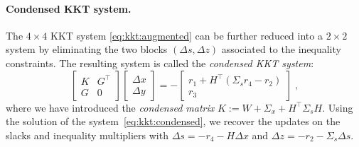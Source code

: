 \paragraph{Condensed KKT system.}
The $4 \times 4$ KKT system \eqref{eq:kkt:augmented} can be further
reduced into a $2 \times 2$ system by eliminating the two blocks
$(\Delta s, \Delta z)$ associated to the inequality constraints.
The resulting system is called the \emph{condensed KKT system}:
\begin{equation}
  \label{eq:kkt:condensed}
  \tag{$K_1$}
  \begin{bmatrix}
    K & G^\top \\
    G & 0
  \end{bmatrix}
  \begin{bmatrix}
    \Delta x \\ \Delta y
  \end{bmatrix}
  =
  -
  \begin{bmatrix}
    r_1 + H^\top(\Sigma_s r_4 - r_2) \\ r_3
  \end{bmatrix}
   \; ,
\end{equation}
where we have introduced the \emph{condensed matrix} $K := W + \Sigma_x + H^\top \Sigma_s H$.
Using the solution of the system~\eqref{eq:kkt:condensed},
we recover the updates on the slacks and inequality multipliers with
$\Delta s = -r_4 - H\Delta x$ and $\Delta z = -r_2 - \Sigma_s \Delta s$.

